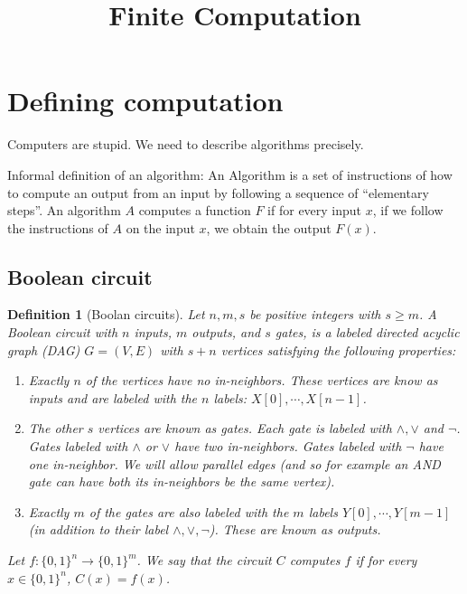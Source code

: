 \documentclass[aps,pra,onecolumn,notitlepage,superscriptaddress]{revtex4-1}
\newtheorem{defi}{Definition}
\begin{document}
    \title{Finite Computation}
    \author{}
    \maketitle
    
    \section{Defining computation}
    Computers are stupid. We need to describe algorithms precisely.

    Informal definition of an algorithm: An Algorithm is a set of instructions of how to compute an output from an input by following a sequence of ``elementary steps''. An algorithm $A$ computes a function $F$ if for every input $x$, if we follow the instructions of $A$ on the input $x$, we obtain the output $F(x)$.

    \subsection{Boolean circuit}
    \begin{defi}[Boolan circuits]
        Let $n,m,s$ be positive integers with $s \geq m$. A Boolean circuit with $n$ inputs, $m$ outputs, and $s$ gates, is a labeled directed acyclic graph (DAG) $G = (V, E)$ with $s+n$ vertices satisfying the following properties:
        \begin{enumerate}
            \item Exactly $n$ of the vertices have no in-neighbors. These vertices are know as inputs and are labeled with the $n$ labels: $X[0], \cdots, X[n-1]$.
            \item The other $s$ vertices are known as gates. Each gate is labeled with $\land, \lor$ and $\lnot$. Gates labeled with $\land$ or $\lor$ have two in-neighbors. Gates labeled with $\lnot$ have one in-neighbor. We will allow parallel edges (and so for example an AND gate can have both its in-neighbors be the same vertex).
            \item Exactly $m$ of the gates are also labeled with the $m$ labels $Y[0], \cdots, Y[m-1]$ (in addition to their label $\land, \lor, \lnot$). These are known as outputs.
        \end{enumerate}

        Let $f:\{0,1\}^n \rightarrow \{0,1\}^m$. We say that the circuit $C$ computes $f$ if for every $x \in \{0,1\}^n$, $C(x) = f(x)$.
    \end{defi}
\end{document}
